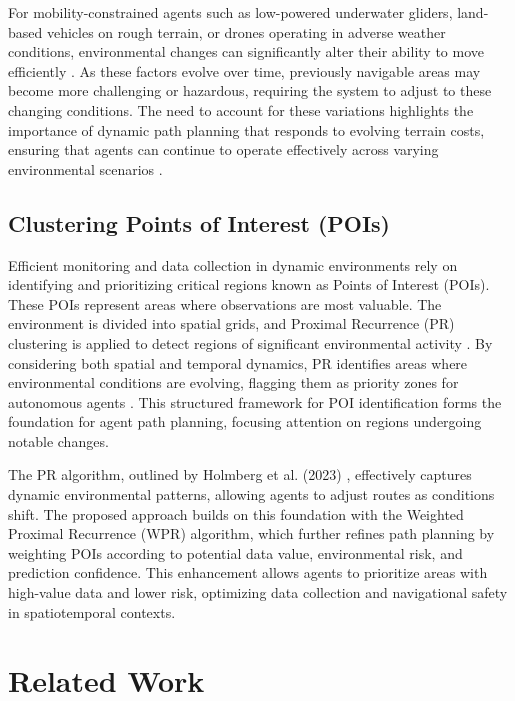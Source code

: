 \documentclass[conference]{IEEEtran}
\begin{document}
For mobility-constrained agents such as low-powered underwater gliders, land-based vehicles on rough terrain, or drones operating in adverse weather conditions, environmental changes can significantly alter their ability to move efficiently \cite{rudnick2015ocean_research}. As these factors evolve over time, previously navigable areas may become more challenging or hazardous, requiring the system to adjust to these changing conditions. The need to account for these variations highlights the importance of dynamic path planning that responds to evolving terrain costs, ensuring that agents can continue to operate effectively across varying environmental scenarios \cite{xu2020greedy_dynamic}.

\subsection{Clustering Points of Interest (POIs)}
Efficient monitoring and data collection in dynamic environments rely on identifying and prioritizing critical regions known as Points of Interest (POIs). These POIs represent areas where observations are most valuable. The environment is divided into spatial grids, and Proximal Recurrence (PR) clustering is applied to detect regions of significant environmental activity \cite{holmberg2023stroobnet}. By considering both spatial and temporal dynamics, PR identifies areas where environmental conditions are evolving, flagging them as priority zones for autonomous agents \cite{wu2014path_problems}. This structured framework for POI identification forms the foundation for agent path planning, focusing attention on regions undergoing notable changes.

The PR algorithm, outlined by Holmberg et al. (2023) \cite{holmberg2023stroobnet}, effectively captures dynamic environmental patterns, allowing agents to adjust routes as conditions shift. The proposed approach builds on this foundation with the Weighted Proximal Recurrence (WPR) algorithm, which further refines path planning by weighting POIs according to potential data value, environmental risk, and prediction confidence. This enhancement allows agents to prioritize areas with high-value data and lower risk, optimizing data collection and navigational safety in spatiotemporal contexts.



\section{Related Work}
\end{document}

